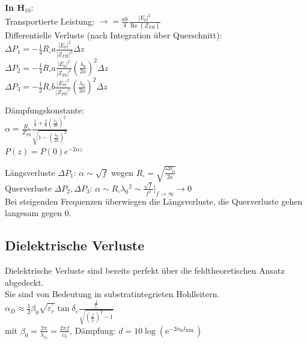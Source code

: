 \documentclass[english]{latex4ei/latex4ei_sheet}
\begin{document}
\begin{sectionbox}
	\textbf{In H$_{10}$}:\\
	Transportierte Leistung: $\rightarrow = \frac{a b}{4} \frac{\left|E_{0}\right|^{2}}{\operatorname{Re}\left\{Z_{F H}\right\}}$\\
	Differentielle Verluste (nach Integration über Querschnitt):\\
	$\Delta P_{1}=-\frac{1}{4} R_{\square} a \frac{\left|E_{0}\right|^{2}}{\left|Z_{F H}\right|^{2}} \Delta z$\\
	$\Delta P_{2}=-\frac{1}{4} R_{\square} a \frac{\left|E_{0}\right|^{2}}{\left|Z_{F 0}\right|^{2}}\left(\frac{\lambda_{0}}{2 a}\right)^{2} \Delta z$ \\
	$\Delta P_{3}=-\frac{1}{2} R_{\square} b \frac{\left|E_{0}\right|^{2}}{\left|Z_{F 0}\right|^{2}}\left(\frac{\lambda_{0}}{2 a}\right)^{2} \Delta z$\\
	\begin{emphbox}
		Dämpfungskonstante:\\
		$\alpha=\frac{R_{\square}}{Z_{F 0}} \frac{\frac{1}{b}+\frac{2}{a}\left(\frac{\lambda_{0}}{2 a}\right)^{2}}{\sqrt{1-\left(\frac{\lambda_{0}}{2 a}\right)^{2}}}$\\ 
		$P(z) = P(0) e^{-2\alpha z}$ 
	\end{emphbox}

	Längsverluste $\Delta P_{1}$: $\alpha \sim \sqrt{f}$ wegen $R_{\square}=\sqrt{\frac{\omega \mu_{0}}{2 \kappa}}$\\ 
	Querverluste $\Delta P_{2}, \Delta P_{3}$: $\alpha \sim R_{\square} \lambda_{0}{ }^{2} \sim \frac{\sqrt{f}}{f^{2}}|_{f \rightarrow \infty} \rightarrow 0$\\ 
	Bei steigenden Frequenzen überwiegen die Längsverluste, die Querverluste gehen langesam gegen 0.

\end{sectionbox}

\begin{sectionbox}
	\subsection{Dielektrische Verluste}
	Dielektrische Verluste sind bereits perfekt über die feldtheoretischen Ansatz abgedeckt.\\
	Sie sind von Bedeutung in substratintegrieten Hohlleitern.\\
	$\alpha_{D} \approx \frac{1}{2} \beta_{0} \sqrt{\varepsilon_{r}^{\prime}} \tan \delta_{\varepsilon} \frac{\frac{f}{f_{c}}}{\sqrt{\left(\frac{f}{f_{c}}\right)^{2}-1}}$\\
	mit $\beta_0 = \frac{2 \pi}{\lambda_{c_0}} = \frac{2 \pi f}{c_0}$,
	Dämpfung: $d=10 \log \left(\mathrm{e}^{-2 \alpha_{\mathrm{D}} l_{\mathrm{RHL}}}\right)$\\
\end{sectionbox}
\end{document}
